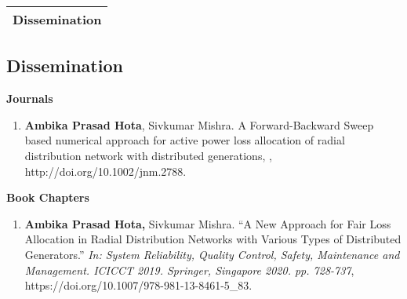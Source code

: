\newpage
\thispagestyle{empty}
\hfill
\vspace{5in}
\begin{table}[h]
\centering
\begin{tabular}{c}
{\huge \bf Dissemination}\\
\hline\hline
\end{tabular}
\end{table}

\begin{spacing}{1.3}
\chapter*{Dissemination}\label{publication}
\small\textbf{Journals}

\begin{enumerate}
\item {\bf Ambika Prasad Hota}, Sivkumar Mishra.
\newblock A Forward-Backward Sweep based numerical approach for active power loss allocation of radial distribution network with distributed generations,
, http://doi.org/10.1002/jnm.2788.



\end{enumerate}
\small\textbf{Book Chapters}
\begin{enumerate}
	
\item \textbf{Ambika Prasad Hota,} Sivkumar Mishra. “A New Approach for Fair Loss Allocation in Radial Distribution Networks with Various Types of Distributed Generators.” \textit{In: System Reliability, Quality Control, Safety, Maintenance and Management. ICICCT 2019. Springer, Singapore 2020. pp. 728-737}, https://doi.org/10.1007/978-981-13-8461-5\_83. 


	
\end{enumerate}



\end{spacing}
